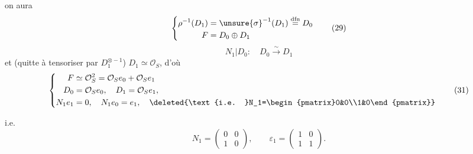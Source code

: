 on aura
\[
\left\{
\begin{aligned}
\rho^{-1}(D_1)&=\unsure{\sigma}^{-1}(D_1)\overset{\mathrm{dfn}}{=}D_0\\
F&=D_0\oplus D_1
\end{aligned}\right.
\tag{29}
\]
\[
N_1|D_0:\quad D_0\xrightarrow{\sim}D_1
\tag{30}
\]
et (quitte à tensoriser par $D_1^{\otimes-1}$) 
$D_1\simeq\mathcal O_S$, d'où
\[
\left\{
\begin{aligned}
F&\simeq\mathcal O_S^2=\mathcal O_S e_0+\mathcal O_S e_1\\
D_0&=\mathcal O_S e_0,\quad D_1=\mathcal O_S e_1,\\
N_1e_1&=0,\quad N_1e_0=e_1,
\quad\deleted{\text{i.e. }N_1=\begin{pmatrix}0&0\\1&0\end{pmatrix}}
\end{aligned}\right.
\tag{31}
\]



i.e.
\[
N_1=\begin{pmatrix}0&0\\1&0\end{pmatrix},\qquad
\varepsilon_1=\begin{pmatrix}1&0\\1&1\end{pmatrix}.
\tag{32}
\]


